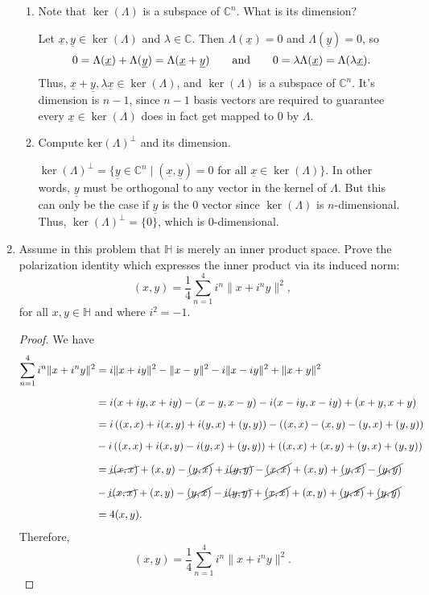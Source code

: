 \documentclass[11pt,oneside,english]{amsart}
\theoremstyle{definition}
\newcommand{\aspace}{\hspace{7mm}\text{and}\hspace{7mm}}
\newcommand{\MB}[1]{\mathbb{#1}}
\renewcommand{\vec}[1]{\underline{#1}}
\begin{document}
\begin{enumerate}
\begin{enumerate}
\item Note that $\ker(\Lambda)$ is a subspace of $\MB{C}^n$. What is its dimension?

Let $\vec x, \vec y\in \ker(\Lambda)$ and $\lambda\in \MB{C}$. Then $\Lambda(\vec x)=0$ and $\Lambda(\vec y)=0$, so
\[
0=\Lambda(\vec x)+\Lambda(\vec y)=\Lambda(\vec x+\vec y)\aspace0=\lambda\Lambda(\vec x)=\Lambda(\lambda \vec x).
\]
Thus, $\vec x+\vec y,\lambda \vec x\in \ker(\Lambda)$, and $\ker(\Lambda)$ is a subspace of $\MB{C}^n$. It's dimension is $n-1$, since $n-1$ basis vectors are required to guarantee every $\vec x\in \ker(\Lambda)$ does in fact get mapped to 0 by $\Lambda$.

\item Compute $\text{ker}(\Lambda)^\perp$ and its dimension.

$\ker(\Lambda)^\perp=\{\vec y\in \MB{C}^n\mid (\vec x,\vec y)=0\text{ for all }\vec x\in \ker(\Lambda)\}$. In other words, $\vec y$ must be orthogonal to any vector in the kernel of $\Lambda$. But this can only be the case if $\vec y$ is the 0 vector since $\ker(\Lambda)$ is $n$-dimensional. Thus, $\ker(\Lambda)^\perp=\{0\}$, which is 0-dimensional.


\end{enumerate}

\item Assume in this problem that $\MB{H}$ is merely an inner product space. Prove the polarization identity which expresses the inner product via its induced norm:
\[
(x,y)=\frac{1}{4}\sum_{n=1}^4i^n\|x+i^ny\|^2,
\]
for all $x,y\in\MB{H}$ and where $i^2=-1$.

\begin{proof}
We have
\begin{align*}
\sum_{n=1}^4i^n\|x+i^ny\|^2&=i\|x+iy\|^2-\|x-y\|^2-i\|x-iy\|^2+\|x+y\|^2\\[2mm]
&=i(x+iy,x+iy)-(x-y,x-y)-i(x-iy,x-iy)+(x+y,x+y)\\[2mm]
&=i\left((x,x)+i(x,y)+i(y,x)+(y,y)\right)-\left((x,x)-(x,y)-(y,x)+(y,y)\right)\\[2mm]
&-i\left((x,x)+i(x,y)-i(y,x)+(y,y)\right)+\left((x,x)+(x,y)+(y,x)+(y,y)\right)\\[2mm]
&=\cancel{i(x,x)}+(x,y)-\cancel{(y,x)}+\cancel{i(y,y)}-\cancel{(x,x)}+(x,y)+\cancel{(y,x)}-\cancel{(y,y)}\\[2mm]
&-\cancel{i(x,x)}+(x,y)-\cancel{(y,x)}-\cancel{i(y,y)}+\cancel{(x,x)}+(x,y)+\cancel{(y,x)}+\cancel{(y,y)}\\[2mm]
&=4(x,y).
\end{align*}
Therefore,
\[
(x,y)=\frac{1}{4}\sum_{n=1}^4i^n\|x+i^ny\|^2.
\]
\end{proof}


\end{enumerate}
\end{document}
